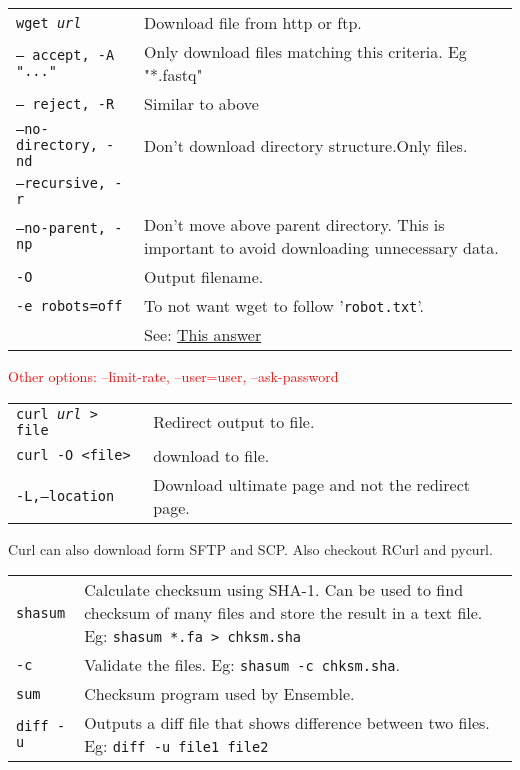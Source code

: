 \begin{tabularx}{\linewidth}{lX}
\hline
\texttt{wget \textit{url}} & Download file from http or ftp.\\
\texttt{-- accept, -A "..."} & Only download files matching this criteria. Eg "*.fastq"\\
\texttt{-- reject, -R} & Similar to above\\
\texttt{--no-directory, -nd} & Don't download directory structure.Only files.\\
\texttt{--recursive, -r} & \\
\texttt{--no-parent, -np} & Don't move above parent directory. This is important to avoid downloading unnecessary data.\\
\texttt{-O} & Output filename.\\
\texttt{-e robots=off} & To not want wget to follow '\texttt{robot.txt}'.\\
& See: \href{https://stackoverflow.com/a/11124664}{This answer} \\
\hline
\end{tabularx}

\textcolor{red}{Other options: --limit-rate, --user=user, --ask-password}\\


\begin{tabularx}{\linewidth}{lX}
\hline
\texttt{curl \textit{url} > file} & Redirect output to file.\\
\texttt{curl -O <file>} & download to file.\\
\texttt{-L,--location} & Download ultimate page and not the redirect page.\\
\hline
\end{tabularx}
Curl can also download form SFTP and SCP. Also checkout RCurl and pycurl.

\begin{tabularx}{\linewidth}{lX}
\hline
\texttt{shasum} & Calculate checksum using SHA-1. Can be used to find checksum of many files and store the result in a text file. Eg: \texttt{shasum *.fa > chksm.sha}\\
\texttt{-c} & Validate the files. Eg: \texttt{shasum -c chksm.sha}.\\
\texttt{sum} & Checksum program used by Ensemble.\\
\texttt{diff -u} & Outputs a diff file that shows difference between two files. Eg: \texttt{diff -u file1 file2}\\
\hline
\end{tabularx}

